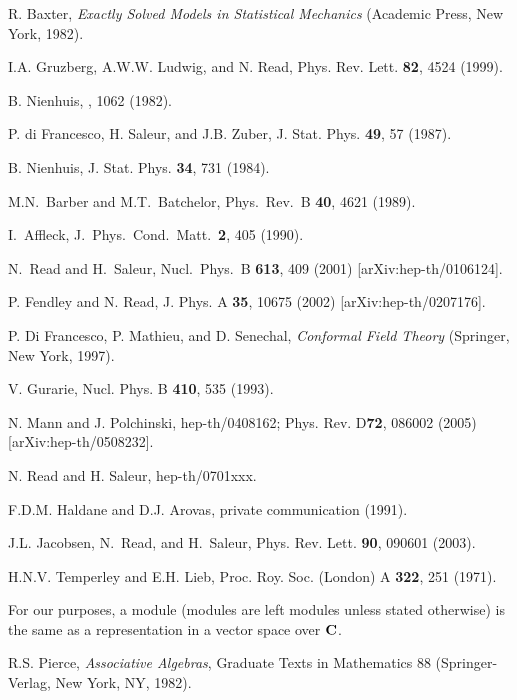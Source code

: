 \documentclass[twocolumn,floats,pra]{revtex4}
\begin{document}
\begin{references}


 R. Baxter, {\it Exactly Solved Models in Statistical
Mechanics} (Academic Press, New York, 1982).

 I.A. Gruzberg, A.W.W. Ludwig, and N. Read, Phys.
Rev. Lett. {\bf 82}, 4524 (1999).

 B. Nienhuis, , 1062 (1982).

 P. di Francesco, H. Saleur, and J.B. Zuber,
J. Stat. Phys. {\bf 49}, 57 (1987).

 B. Nienhuis, J. Stat. Phys. {\bf 34}, 731
(1984).

M.N.~Barber and M.T.~Batchelor, Phys.~Rev.~B {\bf
40}, 4621 (1989).

 I.~Affleck, J.~Phys.~Cond.~Matt.~{\bf 2},
405 (1990).

N.~Read and H.~Saleur, Nucl.\ Phys.\ B {\bf 613}, 409 (2001)
[arXiv:hep-th/0106124].

 P. Fendley and N. Read, J. Phys. A {\bf 35}, 10675
(2002) [arXiv:hep-th/0207176].


P. Di Francesco, P. Mathieu, and D. Senechal, {\it
Conformal Field Theory} (Springer, New York, 1997).

 V. Gurarie, Nucl. Phys. B {\bf 410}, 535 (1993).

 N. Mann and J. Polchinski, hep-th/0408162;
 Phys. Rev. D{\bf 72}, 086002 (2005)[arXiv:hep-th/0508232].

 N. Read and H. Saleur, hep-th/0701xxx.

 F.D.M. Haldane and D.J. Arovas, private communication
(1991).

 J.L. Jacobsen, N.~Read, and H.~Saleur, Phys. Rev. Lett.
{\bf 90}, 090601 (2003).

H.N.V. Temperley and E.H. Lieb, Proc. Roy. Soc. (London) A {\bf
322}, 251 (1971).

 For our purposes, a module (modules are left
modules unless stated otherwise) is the same as a representation
in a vector space over $\bf C$.

 R.S. Pierce, {\it Associative Algebras}, Graduate
Texts in Mathematics 88 (Springer-Verlag, New York, NY, 1982).


\end{references}
\end{document}
